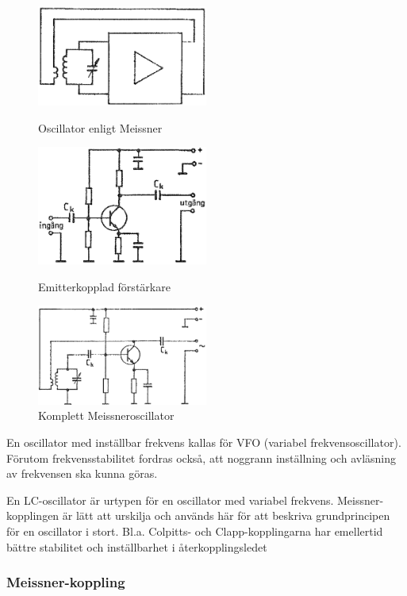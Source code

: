 \begin{figure}
  \includegraphics[width=0.5\textwidth]{images/cropped_pdfs/bild_2_3-66.pdf}
  \caption{Oscillator enligt Meissner}
  \label{fig:BildII3-66}

  \includegraphics[width=0.5\textwidth]{images/cropped_pdfs/bild_2_3-67.pdf}
  \caption{Emitterkopplad förstärkare}
  \label{fig:BildII3-67}

  \includegraphics[width=0.5\textwidth]{images/cropped_pdfs/bild_2_3-68.pdf}
  \caption{Komplett Meissneroscillator}
  \label{fig:BildII3-68}
\end{figure}

En oscillator med inställbar frekvens kallas för VFO (variabel
frekvensoscillator).
Förutom frekvensstabilitet fordras också, att noggrann inställning och
avläsning av frekvensen ska kunna göras.

En LC-oscillator är urtypen för en oscillator med variabel frekvens.
Meissner-kopplingen är lätt att urskilja och används här för att beskriva
grundprincipen för en oscillator i stort.
Bl.a. Colpitts- och Clapp-kopplingarna har emellertid bättre stabilitet och
inställbarhet i återkopplingsledet

\subsubsection{Meissner-koppling}


